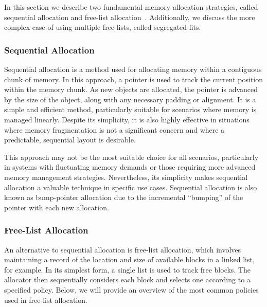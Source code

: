 
In this section we describe two fundamental memory allocation strategies, called sequential allocation and free-list allocation~\cite{gchandbook}. Additionally, we discuss the more complex case of using multiple free-lists, called segregated-fits.

\subsubsection{Sequential Allocation}
\label{sec:seq_allocation}
\label{sec:bump_pointer}

Sequential allocation is a method used for allocating memory within a contiguous chunk of memory. In this approach, a pointer is used to track the current position within the memory chunk. As new objects are allocated, the pointer is advanced by the size of the object, along with any necessary padding or alignment. It is a simple and efficient method, particularly suitable for scenarios where memory is managed linearly. Despite its simplicity, it is also highly effective in situations where memory fragmentation is not a significant concern and where a predictable, sequential layout is desirable.

This approach may not be the most suitable choice for all scenarios, particularly in systems with fluctuating memory demands or those requiring more advanced memory management strategies. Nevertheless, its simplicity makes sequential allocation a valuable technique in specific use cases. Sequential allocation is also known as bump-pointer allocation due to the incremental ``bumping'' of the pointer with each new allocation. 

\subsubsection{Free-List Allocation}

An alternative to sequential allocation is free-list allocation, which involves maintaining a record of the location and size of available blocks in a linked list, for example. In its simplest form, a single list is used to track free blocks. The allocator then sequentially considers each block and selects one according to a specified policy. Below, we will provide an overview of the most common policies used in free-list allocation.

